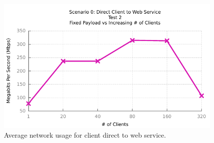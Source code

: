 \begin{figure}[H]
	\caption{Average network usage for client direct to web service.}
	\centerline{\includegraphics{img/direct_fp_iu_kbs}}
	\label{fig:direct-2-3}
\end{figure}
